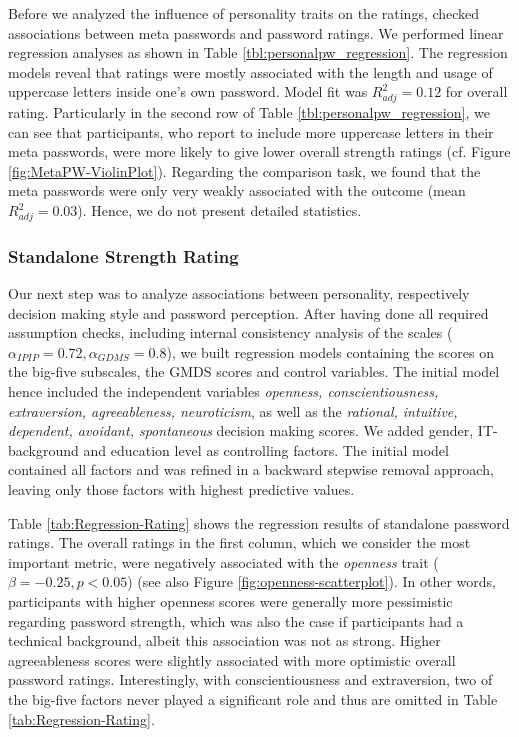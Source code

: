 Before we analyzed the influence of personality traits on the ratings, checked associations between meta passwords and password ratings. We performed linear regression analyses as shown in Table \ref{tbl:personalpw_regression}. The regression models reveal that ratings were mostly associated with the length and usage of uppercase letters inside one's own password. Model fit was $R^2_{adj}=0.12$ for overall rating. Particularly in the second row of Table \ref{tbl:personalpw_regression}, we can see that participants, who report to include more uppercase letters in their meta passwords, were more likely to give lower overall strength ratings (cf. Figure \ref{fig:MetaPW-ViolinPlot}). Regarding the comparison task, we found that the meta passwords were only very weakly associated with the outcome (mean $R^2_{adj}=0.03$). Hence, we do not present detailed statistics. 





\subsubsection{Standalone Strength Rating}
Our next step was to analyze associations between personality, respectively decision making style and password perception. After having done all required assumption checks, including internal consistency analysis of the scales ($\alpha_{IPIP}=0.72, \alpha_{GDMS}=0.8$), we built regression models containing the scores on the big-five subscales, the GMDS scores and control variables. The initial model hence included the independent variables \textit{openness, conscientiousness, extraversion, agreeableness, neuroticism}, as well as the \textit{rational, intuitive, dependent, avoidant, spontaneous} decision making scores. We added gender, IT-background and education level as controlling factors. The initial model contained all factors and was refined in a backward stepwise removal approach, leaving only those factors with highest predictive values. 

Table \ref{tab:Regression-Rating} shows the regression results of standalone password ratings. The overall ratings in the first column, which we consider the most important metric, were negatively associated with the \textit{openness} trait ($\beta = -0.25, p < 0.05$) (see also Figure \ref{fig:openness-scatterplot}). In other words, participants with higher openness scores were generally more pessimistic regarding password strength, which was also the case if participants had a technical background, albeit this association was not as strong. Higher agreeableness scores were slightly associated with more optimistic overall password ratings. Interestingly, with conscientiousness and extraversion, two of the big-five factors never played a significant role and thus are omitted in Table \ref{tab:Regression-Rating}.

